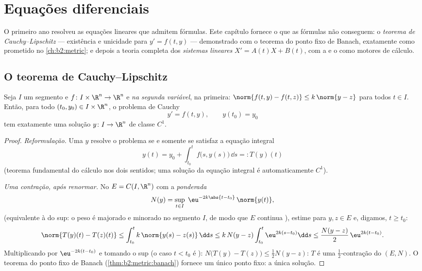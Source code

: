 \chapter{Equações diferenciais}\label{ch:b2:diffeq}

O primeiro ano resolveu as equações lineares que admitem fórmulas. Este capítulo
fornece o que as fórmulas não conseguem: o \emph{teorema de Cauchy--Lipschitz}
--- existência e unicidade para $y' = f(t, y)$ --- demonstrado com o
teorema do ponto fixo de Banach, exatamente como prometido no
\cref{ch:b2:metric}; e depois a teoria completa dos \emph{sistemas
lineares} $X' = A(t)X + B(t)$, com a  e o
 como motores de cálculo.

\section{O teorema de Cauchy--Lipschitz}

\begin{theorem}\label{thm:b2:diffeq:cauchylipschitz}
Seja $I$ um segmento e $f \colon I \times \R^n \to \R^n$ 
e \emph{ na segunda variável},  na
primeira: $\norm{f(t, y) - f(t, z)} \leq k\,\norm{y - z}$ para todos $t
\in I$. Então, para todo $(t_0, y_0) \in I \times \R^n$, o problema
de Cauchy
\[
y' = f(t, y), \qquad y(t_0) = y_0
\]
tem exatamente uma solução $y \colon I \to \R^n$ de classe $C^1$.
\end{theorem}

\begin{proof}
\emph{Reformulação.} Uma $y$  resolve o problema se e somente se
satisfaz a equação integral
\[
y(t) = y_0 + \int_{t_0}^{t} f\bigl(s, y(s)\bigr)\,\dd s
=: T(y)(t)
\]
(teorema fundamental do cálculo nos dois sentidos; uma solução 
da equação integral é automaticamente $C^1$).

\emph{Uma contração, após renormar.} No  $E =
C(I, \R^n)$ com a  \emph{ponderada}
\[
N(y) = \sup_{t \in I}\; \eu^{-2k\abs{t - t_0}}\,\norm{y(t)} ,
\]
(equivalente à  do sup: o peso é majorado e minorado
no segmento $I$, de modo que $E$ continua ), estime para $y, z \in
E$ e, digamos, $t \geq t_0$:
\[
\norm{T(y)(t) - T(z)(t)}
\leq \int_{t_0}^{t} k\,\norm{y(s) - z(s)}\,\dd s
\leq k\,N(y - z)\int_{t_0}^{t} \eu^{2k(s - t_0)}\dd s
\leq \frac{N(y-z)}{2}\,\eu^{2k(t - t_0)} .
\]
Multiplicando por $\eu^{-2k(t - t_0)}$ e tomando o sup (o caso $t
< t_0$ é ): $N\bigl(T(y) - T(z)\bigr) \leq \frac12 N(y -
z)$: $T$ é uma $\frac12$-contração do  $(E, N)$. O
teorema do ponto fixo de Banach (\cref{thm:b2:metric:banach}) fornece um
único ponto fixo: a única solução.
\end{proof}

